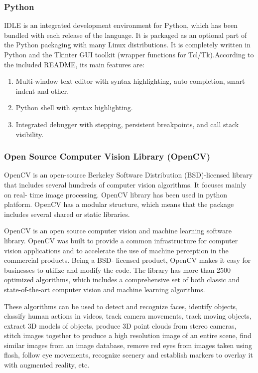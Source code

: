 \documentclass[12pt, a4paper]{article}
\begin{document}
\subsubsection{Python}

IDLE is an integrated development environment for Python, which has been bundled with each release of the language. It is packaged as an optional part of the Python packaging
with many Linux distributions. It is completely written in Python and the Tkinter GUI
toolkit (wrapper functions for Tcl/Tk).According to the included README, its main
features are:
\begin{enumerate}
\item Multi-window text editor with syntax highlighting, auto completion, smart indent
and other.
\item Python shell with syntax highlighting.
\item Integrated debugger with stepping, persistent breakpoints, and call stack visibility.
\end{enumerate}
\subsubsection{Open Source Computer Vision Library (OpenCV)}
OpenCV is an open-source Berkeley Software Distribution (BSD)-licensed library
that includes several hundreds of computer vision algorithms. It focuses mainly on real-
time image processing. OpenCV library has been used in python platform.
OpenCV has a modular structure, which means that the package includes several shared or
static libraries.

OpenCV is an open source computer vision and machine learning software library.
OpenCV was built to provide a common infrastructure for computer vision applications and
to accelerate the use of machine perception in the commercial products. Being a BSD-
licensed product, OpenCV makes it easy for businesses to utilize and modify the code.
The library has more than 2500 optimized algorithms, which includes a comprehensive
set of both classic and state-of-the-art computer vision and machine learning algorithms.

These algorithms can be used to detect and recognize faces, identify objects, classify human
actions in videos, track camera movements, track moving objects, extract 3D models of
objects, produce 3D point clouds from stereo cameras, stitch images together to produce
a high resolution image of an entire scene, find similar images from an image database,
remove red eyes from images taken using flash, follow eye movements, recognize scenery
and establish markers to overlay it with augmented reality, etc.
\end{document}
